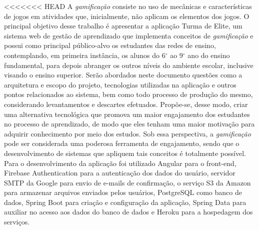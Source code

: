\setlength{\absparsep}{18pt} %
\begin{resumo}

 \vspace{\onelineskip}

<<<<<<< HEAD
 A \textit{gamificação} consiste no uso de mecânicas e características de jogos em atividades que, inicialmente, não aplicam os elementos dos jogos. O principal objetivo desse trabalho é apresentar a aplicação Turma de Elite, um sistema web de gestão de aprendizado que implementa conceitos de \textit{gamificação} e possui como principal público-alvo os estudantes das redes de ensino, contemplando, em primeira instância, os alunos do 6$^\circ$ ao 9$^\circ$ ano do ensino fundamental, para depois abranger os outros níveis do ambiente escolar, inclusive visando o ensino superior. Serão abordados neste documento questões como a arquitetura e escopo do projeto, tecnologias utilizadas na aplicação e outros pontos relacionados ao sistema, bem como todo processo de produção do mesmo, considerando levantamentos e descartes efetuados. 
 Propõe-se, desse modo, criar uma alternativa tecnológica que promova um maior engajamento dos estudantes no processo de aprendizado, de modo que eles tenham uma maior motivação para adquirir conhecimento por meio dos estudos. Sob essa perspectiva, a \textit{gamificação} pode ser considerada uma poderosa ferramenta de engajamento, sendo que o desenvolvimento de sistemas que apliquem tais conceitos é totalmente possível. Para o desenvolvimento da aplicação foi utilizado Angular para o front-end, Firebase Authentication para a autenticação dos dados do usuário, servidor SMTP da Google para envio de e-mails de confirmação, o serviço S3 da Amazon para armazenar arquivos enviados pelos usuários, PostgreSQL como banco de dados, Spring Boot para criação e configuração da aplicação, Spring Data para auxiliar no acesso aos dados do banco de dados e Heroku para a hospedagem dos serviços.
 
 \vspace{\onelineskip}
 

\end{resumo}
